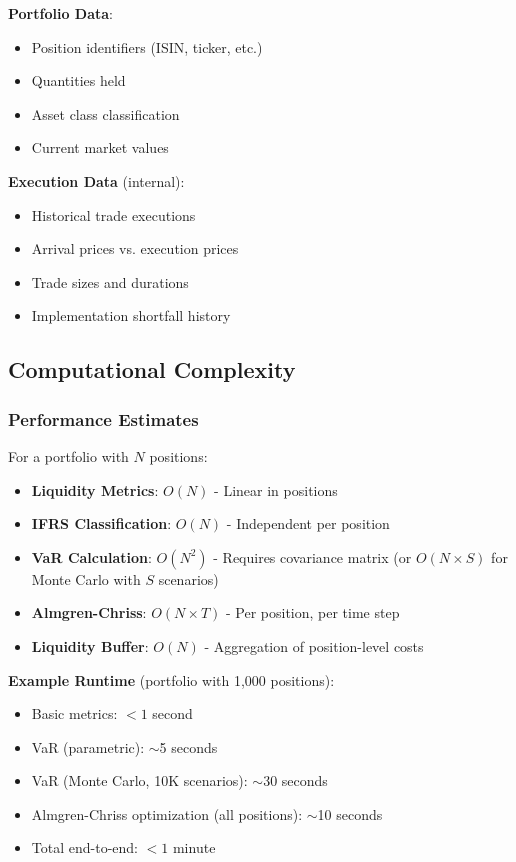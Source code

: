 \documentclass[11pt,a4paper]{article}
\begin{document}
\textbf{Portfolio Data}:
\begin{itemize}
    \item Position identifiers (ISIN, ticker, etc.)
    \item Quantities held
    \item Asset class classification
    \item Current market values
\end{itemize}

\textbf{Execution Data} (internal):
\begin{itemize}
    \item Historical trade executions
    \item Arrival prices vs. execution prices
    \item Trade sizes and durations
    \item Implementation shortfall history
\end{itemize}

\subsection{Computational Complexity}

\subsubsection{Performance Estimates}

For a portfolio with $N$ positions:

\begin{itemize}
    \item \textbf{Liquidity Metrics}: $O(N)$ - Linear in positions
    \item \textbf{IFRS Classification}: $O(N)$ - Independent per position
    \item \textbf{VaR Calculation}: $O(N^2)$ - Requires covariance matrix (or $O(N \times S)$ for Monte Carlo with $S$ scenarios)
    \item \textbf{Almgren-Chriss}: $O(N \times T)$ - Per position, per time step
    \item \textbf{Liquidity Buffer}: $O(N)$ - Aggregation of position-level costs
\end{itemize}

\textbf{Example Runtime} (portfolio with 1,000 positions):
\begin{itemize}
    \item Basic metrics: $< 1$ second
    \item VaR (parametric): $\sim$5 seconds
    \item VaR (Monte Carlo, 10K scenarios): $\sim$30 seconds
    \item Almgren-Chriss optimization (all positions): $\sim$10 seconds
    \item Total end-to-end: $< 1$ minute
\end{itemize}
\end{document}
